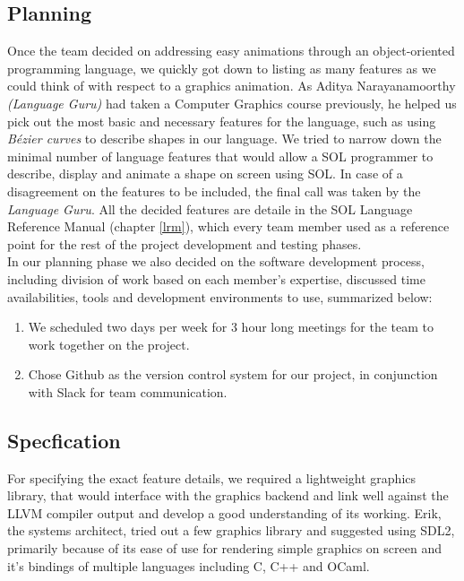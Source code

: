 \documentclass[letterpaper,12pt]{report}
\begin{document}
    \subsection{Planning}
      Once the team decided on addressing easy animations through an object-oriented programming language, we quickly got down to listing as many features as we could think of with respect to a graphics animation. As Aditya Narayanamoorthy \textit{(Language Guru)} had taken a Computer Graphics course previously, he helped us pick out the most basic and necessary features for the language, such as using \textit{B\'ezier curves} to describe shapes in our language. We tried to narrow down the minimal number of language features that would allow a SOL programmer to describe, display and animate a shape on screen using SOL. In case of a disagreement on the features to be included, the final call was taken by the \textit{Language Guru}. All the decided features are detaile in the SOL Language Reference Manual (chapter \ref{lrm}), which every team member used as a reference point for the rest of the project development and testing phases.\\

      In our planning phase we also decided on the software development process, including division of work based on each member's expertise, discussed time availabilities, tools and development environments to use, summarized below:
      \begin{enumerate}
        \itemsep 0em
        \item We scheduled two days per week for 3 hour long meetings for the team to work together on the project.
        \item Chose Github as the version control system for our project, in conjunction with Slack for team communication.
      \end{enumerate}

    \subsection{Specfication}
      For specifying the exact feature details, we required a lightweight graphics library, that would interface with the graphics backend and link well against the LLVM compiler output and develop a good understanding of its working. Erik, the systems architect, tried out a few graphics library and suggested using SDL2, primarily because of its ease of use for rendering simple graphics on screen and it's bindings of multiple languages including C, C++ and OCaml.\\
\end{document}
